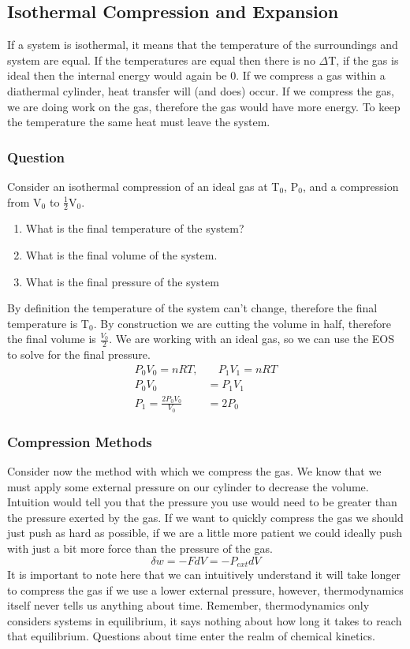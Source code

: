 \documentclass{article}
\begin{document}
\subsection*{Isothermal Compression and Expansion}
If a system is isothermal, it means that the temperature of the surroundings and system are equal. 
If the temperatures are equal then there is no $\Delta$T, if the gas is ideal then the internal energy would again be 0. 
If we compress a gas within a diathermal cylinder, heat transfer will (and does) occur. 
If we compress the gas, we are doing work on the gas, therefore the gas would have more energy. To keep the temperature the same heat must leave the system. 

\subsubsection*{Question}
Consider an isothermal compression of an ideal gas at T$_0$, P$_0$, and a compression from V$_0$ to $\frac{1}{2}$V$_0$. 
\begin{enumerate}
    \item What is the final temperature of the system?
    \item What is the final volume of the system. 
    \item What is the final pressure of the system
\end{enumerate}
By definition the temperature of the system can't change, therefore the final temperature is T$_0$. 
By construction we are cutting the volume in half, therefore the final volume is $\frac{V_0}{2}$. 
We are working with an ideal gas, so we can use the EOS to solve for the final pressure.
\begin{equation}
    \begin{split}
        P_0V_0=nRT, &\quad P_1V_1=nRT \\
        P_0V_0 &= P_1V_1 \\
        P_1 = \frac{2P_0V_0}{V_0} &= 2P_0
    \end{split}
\end{equation}
\subsubsection*{Compression Methods}
Consider now the method with which we compress the gas. 
We know that we must apply some external pressure on our cylinder to decrease the volume.
Intuition would tell you that the pressure you use would need to be greater than the pressure exerted by the gas. 
If we want to quickly compress the gas we should just push as hard as possible, if we are a little more patient we could ideally push with just a bit more force than the pressure of the gas. 
\begin{equation}
    \delta w = -FdV = -P_{ext}dV
\end{equation}
It is important to note here that we can intuitively understand it will take longer to compress the gas if we use a lower external pressure, however, thermodynamics itself never tells us anything about time. 
Remember, thermodynamics only considers systems in equilibrium, it says nothing about how long it takes to reach that equilibrium.
Questions about time enter the realm of chemical kinetics. 
\end{document}
